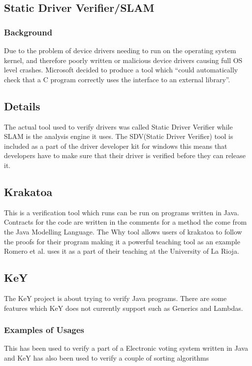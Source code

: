 \documentclass[a4paper,12pt]{scrartcl}
\begin{document}
{{		}
		\subsection{Static Driver Verifier/SLAM\cite{Ball2004}}
		{
			\subsubsection{Background}
			{
				Due to the problem of device drivers needing to run on the operating system kernel, and therefore poorly written or malicious device drivers causing full OS level crashes. Microsoft decided to produce a tool which \enquote{could automatically check that a C program correctly uses the interface to an external library}\cite{Ball2004}.
			}
		
			\subsection{Details}
			{
				The actual tool used to verify drivers was called Static Driver Verifier while SLAM is the analysis engine it uses. The SDV(Static Driver Verifier) tool is included as a part of the driver developer kit for windows this means that developers have to make sure that their driver is verified before they can release it.
			}
		}
		
		\subsection{Krakatoa \cite{Marche2018,Filliatre2007}}\label{sec:krakatoa}
		{
			This is a verification tool which runs can be run on programs written in Java. Contracts for the code are written in the comments for a method the come from the Java Modelling Language\cite{Burdy2004}. The Why tool allows users of krakatoa to follow the proofs for their program making it a powerful teaching tool as an example Romero et al. uses it as a part of their teaching at the University of La Rioja\cite{Romero2018}.
		}
		
		\subsection{KeY}
		{
			The KeY project is about trying to verify Java programs. There are some features which KeY does not currently support such as Generics and Lambdas\cite{Ahrendt2016}.
			\subsubsection{Examples of Usages}
			{
				This has been used to verify a part of a Electronic voting system written in Java and KeY has also been used to verify a couple of sorting algorithms
			}
		}
}
\end{document}
